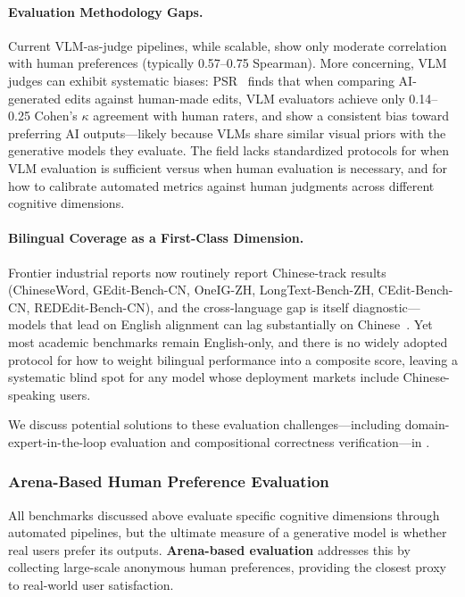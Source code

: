 \paragraph{Evaluation Methodology Gaps.} Current VLM-as-judge pipelines, while scalable, show only moderate correlation with human preferences (typically 0.57--0.75 Spearman). More concerning, VLM judges can exhibit systematic biases: PSR~\citep{taesiri2025understanding} finds that when comparing AI-generated edits against human-made edits, VLM evaluators achieve only 0.14--0.25 Cohen's $\kappa$ agreement with human raters, and show a consistent bias toward preferring AI outputs---likely because VLMs share similar visual priors with the generative models they evaluate. The field lacks standardized protocols for when VLM evaluation is sufficient versus when human evaluation is necessary, and for how to calibrate automated metrics against human judgments across different cognitive dimensions.

\paragraph{Bilingual Coverage as a First-Class Dimension.} Frontier industrial reports now routinely report Chinese-track results (ChineseWord, GEdit-Bench-CN, OneIG-ZH, LongText-Bench-ZH, CEdit-Bench-CN, REDEdit-Bench-CN), and the cross-language gap is itself diagnostic---models that lead on English alignment can lag substantially on Chinese~\citep{wu2025qwen, team2025longcat, team2026firered}. Yet most academic benchmarks remain English-only, and there is no widely adopted protocol for how to weight bilingual performance into a composite score, leaving a systematic blind spot for any model whose deployment markets include Chinese-speaking users.

We discuss potential solutions to these evaluation challenges---including domain-expert-in-the-loop evaluation and compositional correctness verification---in .


\subsubsection{Arena-Based Human Preference Evaluation}
\label{subsubsec:arena}

All benchmarks discussed above evaluate specific cognitive dimensions through automated pipelines, but the ultimate measure of a generative model is whether real users prefer its outputs. \textbf{Arena-based evaluation} addresses this by collecting large-scale anonymous human preferences, providing the closest proxy to real-world user satisfaction.

